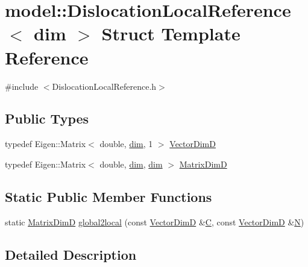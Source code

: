 \hypertarget{structmodel_1_1_dislocation_local_reference}{}\section{model\+:\+:Dislocation\+Local\+Reference$<$ dim $>$ Struct Template Reference}
\label{structmodel_1_1_dislocation_local_reference}


{\ttfamily \#include $<$Dislocation\+Local\+Reference.\+h$>$}

\subsection*{Public Types}
\begin{DoxyCompactItemize}
\item 
typedef Eigen\+::\+Matrix$<$ double, \hyperlink{plot_nd_a_8m_a382f3ca768b275b8d563604f7fc7df73}{dim}, 1 $>$ \hyperlink{structmodel_1_1_dislocation_local_reference_a315cfe9ab738ac5e16abff3393e40a06}{Vector\+Dim\+D}
\item 
typedef Eigen\+::\+Matrix$<$ double, \hyperlink{plot_nd_a_8m_a382f3ca768b275b8d563604f7fc7df73}{dim}, \hyperlink{plot_nd_a_8m_a382f3ca768b275b8d563604f7fc7df73}{dim} $>$ \hyperlink{structmodel_1_1_dislocation_local_reference_a0a41d2b614d726c3b2b35a086b1de3ef}{Matrix\+Dim\+D}
\end{DoxyCompactItemize}
\subsection*{Static Public Member Functions}
\begin{DoxyCompactItemize}
\item 
static \hyperlink{structmodel_1_1_dislocation_local_reference_a0a41d2b614d726c3b2b35a086b1de3ef}{Matrix\+Dim\+D} \hyperlink{structmodel_1_1_dislocation_local_reference_a90b9cfc8a6d2c92d9455150022c50eae}{global2local} (const \hyperlink{structmodel_1_1_dislocation_local_reference_a315cfe9ab738ac5e16abff3393e40a06}{Vector\+Dim\+D} \&\hyperlink{plot_cells_8m_aaa53ca0b650dfd85c4f59fa156f7a2cc}{C}, const \hyperlink{structmodel_1_1_dislocation_local_reference_a315cfe9ab738ac5e16abff3393e40a06}{Vector\+Dim\+D} \&\hyperlink{thompson__tetrahedron_8m_a7823765a845eb81829f110d8337f81ae}{N})
\end{DoxyCompactItemize}


\subsection{Detailed Description}
